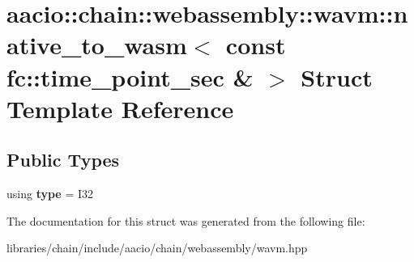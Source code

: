 \hypertarget{structaacio_1_1chain_1_1webassembly_1_1wavm_1_1native__to__wasm_3_01const_01fc_1_1time__point__sec_01_6_01_4}{}\section{aacio\+:\+:chain\+:\+:webassembly\+:\+:wavm\+:\+:native\+\_\+to\+\_\+wasm$<$ const fc\+:\+:time\+\_\+point\+\_\+sec \& $>$ Struct Template Reference}
\label{structaacio_1_1chain_1_1webassembly_1_1wavm_1_1native__to__wasm_3_01const_01fc_1_1time__point__sec_01_6_01_4}
\subsection*{Public Types}
\begin{DoxyCompactItemize}
\item 
\mbox{\label{structaacio_1_1chain_1_1webassembly_1_1wavm_1_1native__to__wasm_3_01const_01fc_1_1time__point__sec_01_6_01_4_a7e2b4244a82452988f0c40f3181c55b5}} 
using {\bfseries type} = I32
\end{DoxyCompactItemize}


The documentation for this struct was generated from the following file\+:\begin{DoxyCompactItemize}
\item 
libraries/chain/include/aacio/chain/webassembly/wavm.\+hpp\end{DoxyCompactItemize}
